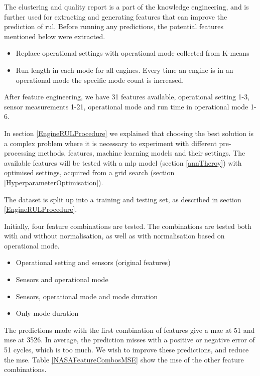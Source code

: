 \documentclass[english, a4paper]{report}
\begin{document}
{{{{                The clustering and quality report is a part of the knowledge engineering, and is further used for extracting and generating features that can improve the prediction of \gls{rul}. Before running any predictions, the potential features mentioned below were extracted.
                
                \begin{itemize}
                    \item Replace operational settings with operational mode collected from K-means 
                    \item Run length in each mode for all engines. Every time an engine is in an operational mode the specific mode count is increased.
                \end{itemize}
                
                After feature engineering, we have 31 features available, operational setting 1-3, sensor measurements 1-21, operational mode and run time in operational mode 1-6. 
                \par 
                In section \ref{EngineRULProcedure} we explained that choosing the best solution is a complex problem where it is necessary to experiment with different pre-processing methods, features, machine learning models and their settings. The available features will be tested with a \gls{mlp} model (section \ref{annTheroy}) with optimised settings, acquired from a grid search (section \ref{HyperparameterOptimisation}).
                \par 
                The dataset is split up into a training and testing set, as described in section \ref{EngineRULProcedure}.
                \par
                Initially, four feature combinations are tested. The combinations are tested both with and without normalisation, as well as with normalisation based on operational mode. 
                \begin{itemize}
                	\item Operational setting and sensors (original features)
                	\item Sensors and operational mode
                	\item Sensors, operational mode and mode duration
                	\item Only mode duration
                \end{itemize}
                
                The predictions made with the first combination of features give a \gls{mae} at 51 and \gls{mse} at 3526. In average, the prediction misses with a positive or negative error of 51 cycles, which is too much. We wish to improve these predictions, and reduce the \gls{mse}. Table \ref{NASAFeatureCombosMSE} show the \gls{mse} of the other feature combinations.
                
}}}}
\end{document}
